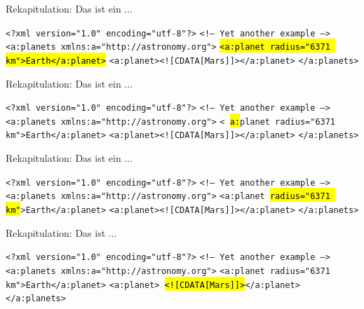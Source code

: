 \documentclass{beamer}
\makeatletter
\newcommand\SoulColor{%
	\let\set@color\beamerorig@set@color
	\let\reset@color\beamerorig@reset@color}
\makeatother
\begin{document}
\begin{frame}{Rekapitulation: Das ist ein ...}
	
	\texttt{<?xml version="1.0" encoding="utf-8"?>} \newline
	\texttt{<!-- Yet another example -->} \newline
	\texttt{<a:planets xmlns:a="http://astronomy.org">} \newline
	\SoulColor\hl{\texttt{<a:planet radius="6371 km">Earth</a:planet>}} \newline
	\texttt{<a:planet><![CDATA[Mars]]></a:planet>} \newline
	\texttt{</a:planets>}
	
\end{frame}

\begin{frame}{Rekapitulation: Das ist ein ...}
	
	\texttt{<?xml version="1.0" encoding="utf-8"?>} \newline
	\texttt{<!-- Yet another example -->} \newline
	\texttt{<a:planets xmlns:a="http://astronomy.org">} \newline
	\texttt{<\SoulColor\hl{a:}planet radius="6371 km">Earth</a:planet>} \newline
	\texttt{<a:planet><![CDATA[Mars]]></a:planet>} \newline
	\texttt{</a:planets>}
	
\end{frame}

\begin{frame}{Rekapitulation: Das ist ein ...}
	
	\texttt{<?xml version="1.0" encoding="utf-8"?>} \newline
	\texttt{<!-- Yet another example -->} \newline
	\texttt{<a:planets xmlns:a="http://astronomy.org">} \newline
	\texttt{<a:planet \SoulColor\hl{radius="6371 km"}>Earth</a:planet>} \newline
	\texttt{<a:planet><![CDATA[Mars]]></a:planet>} \newline
	\texttt{</a:planets>}
	
\end{frame}

\begin{frame}{Rekapitulation: Das ist ...}
	
	\texttt{<?xml version="1.0" encoding="utf-8"?>} \newline
	\texttt{<!-- Yet another example -->} \newline
	\texttt{<a:planets xmlns:a="http://astronomy.org">} \newline
	\texttt{<a:planet radius="6371 km">Earth</a:planet>} \newline
	\texttt{<a:planet>\SoulColor\hl{<![CDATA[Mars]]>}</a:planet>} \newline
	\texttt{</a:planets>}
	
\end{frame}
\end{document}
